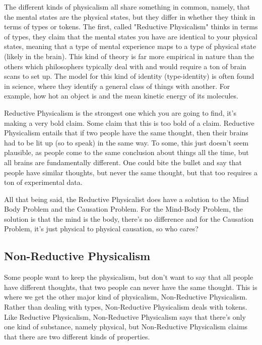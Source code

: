 The different kinds of physicalism all share something in common, namely, that the mental states are the physical states, but they differ in whether they think in terms of types or tokens. The first, called "Reductive Physicalism" thinks in terms of types, they claim that the mental states you have are identical to your physical states, meaning that a type of mental experience maps to a type of physical state (likely in the brain). This kind of theory is far more empirical in nature than the others which philosophers typically deal with and would require a ton of brain scans to set up. The model for this kind of identity (type-identity) is often found in science, where they identify a general class of things with another. For example, how hot an object is and the mean kinetic energy of its molecules. 

Reductive Physicalism is the strongest one which you are going to find, it's making a very bold claim. Some claim that this is too bold of a claim. Reductive Physicalism entails that if two people have the same thought, then their brains had to be lit up (so to speak) in the same way. To some, this just doesn't seem plausible, as people come to the same conclusion about things all the time, but all brains are fundamentally different. One could bite the bullet and say that people have similar thoughts, but never the same thought, but that too requires a ton of experimental data. 

All that being said, the Reductive Physicalist does have a solution to the Mind Body Problem and the Causation Problem. For the Mind-Body Problem, the solution is that the mind is the body, there's no difference and for the Causation Problem, it's just physical to physical causation, so who cares? 

\subsection{Non-Reductive Physicalism}

Some people want to keep the physicalism, but don't want to say that all people have different thoughts, that two people can never have the same thought. This is where we get the other major kind of physicalism, Non-Reductive Physicalism. Rather than dealing with types, Non-Reductive Physicalism deals with tokens. Like Reductive Physicalism, Non-Reductive Physicalism says that there's only one kind of substance, namely physical, but Non-Reductive Physicalism claims that there are two different kinds of properties.

